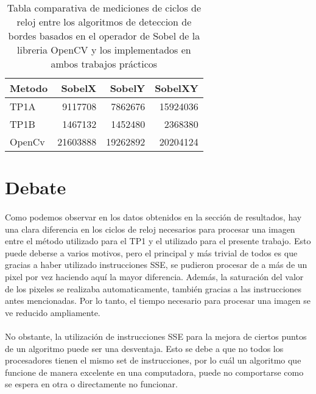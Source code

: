 \documentclass[11pt, a4paper]{article}
\begin{document}
\begin{table}[ht] %
\centering %
\begin{tabular}{|l|r|r|r|}
\hline
Metodo & SobelX & SobelY & SobelXY \\
\hline
TP1A & 9117708 & 7862676 & 15924036 \\
\hline
TP1B & 1467132 & 1452480 & 2368380 \\
\hline
OpenCv & 21603888 & 19262892 & 20204124 \\
\hline



\end{tabular}

\caption{Tabla comparativa de mediciones de ciclos de reloj entre los algoritmos de deteccion de bordes basados en el operador de Sobel de la libreria OpenCV y los implementados en ambos trabajos pr\'acticos} %
\label{Tiempo comparacion} %
\end{table}


\newpage
\section{Debate}
\paragraph{}
Como podemos observar en los datos obtenidos en la secci\'on de resultados, hay una clara diferencia en los ciclos de reloj necesarios para procesar una imagen entre el m\'etodo utilizado para el TP1 y el utilizado para el presente trabajo. Esto puede deberse a varios motivos, pero el principal y m\'as trivial de todos es que gracias a haber utilizado instrucciones SSE, se pudieron procesar de a m\'as de un pixel por vez haciendo aqu\'i la mayor diferencia. Adem\'as, la saturaci\'on del valor de los pixeles se realizaba automaticamente, tambi\'en gracias a las instrucciones antes mencionadas. Por lo tanto, el tiempo necesario para procesar una imagen se ve reducido ampliamente.

\paragraph{}
No obstante, la utilizaci\'on de instrucciones SSE para la mejora de ciertos puntos de un algoritmo puede ser una desventaja. Esto se debe a que no todos los procesadores tienen el mismo set de instrucciones, por lo cu\'al un algoritmo que funcione de manera excelente en una computadora, puede no comportarse como se espera en otra o directamente no funcionar.
\end{document}
